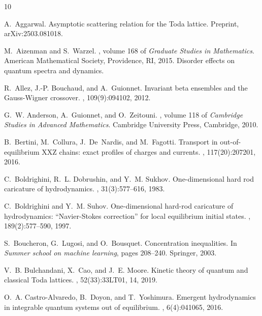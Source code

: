 \documentclass{amsart}
\numberwithin{equation}{section}
\theoremstyle{remark}
\theoremstyle{definition}
\begin{document}
	\begin{thebibliography}{10}
		
		A.~Aggarwal.
		\newblock Asymptotic scattering relation for the {T}oda lattice.
		\newblock Preprint, ar{X}iv:2503.081018.
		
		M.~Aizenman and S.~Warzel.
		, volume 168 of {\em Graduate Studies in
			Mathematics}.
		\newblock American Mathematical Society, Providence, RI, 2015.
		\newblock Disorder effects on quantum spectra and dynamics.
		
		R.~Allez, J.-P. Bouchaud, and A.~Guionnet.
		\newblock Invariant beta ensembles and the Gauss-Wigner crossover.
		, 109(9):094102, 2012.
		
		G.~W. Anderson, A.~Guionnet, and O.~Zeitouni.
		, volume 118 of {\em
			Cambridge Studies in Advanced Mathematics}.
		\newblock Cambridge University Press, Cambridge, 2010.
		
		B.~Bertini, M.~Collura, J.~De~Nardis, and M.~Fagotti.
		\newblock Transport in out-of-equilibrium {XXZ} chains: exact profiles of
		charges and currents.
		, 117(20):207201, 2016.
		
		C.~Boldrighini, R.~L. Dobrushin, and Y.~M. Sukhov.
		\newblock One-dimensional hard rod caricature of hydrodynamics.
		, 31(3):577--616, 1983.
		
		C.~Boldrighini and Y.~M. Suhov.
		\newblock One-dimensional hard-rod caricature of hydrodynamics:
		``{N}avier-{S}tokes correction'' for local equilibrium initial states.
		, 189(2):577--590, 1997.
		
		S.~Boucheron, G.~Lugosi, and O.~Bousquet.
		\newblock Concentration inequalities.
		\newblock In {\em Summer school on machine learning}, pages 208--240. Springer,
		2003.
		
		V.~B. Bulchandani, X.~Cao, and J.~E. Moore.
		\newblock Kinetic theory of quantum and classical {T}oda lattices.
		, 52(33):33LT01, 14, 2019.
		
		O.~A. Castro-Alvaredo, B.~Doyon, and T.~Yoshimura.
		\newblock Emergent hydrodynamics in integrable quantum systems out of
		equilibrium.
		, 6(4):041065, 2016.
		

\end{thebibliography}
\end{document}
